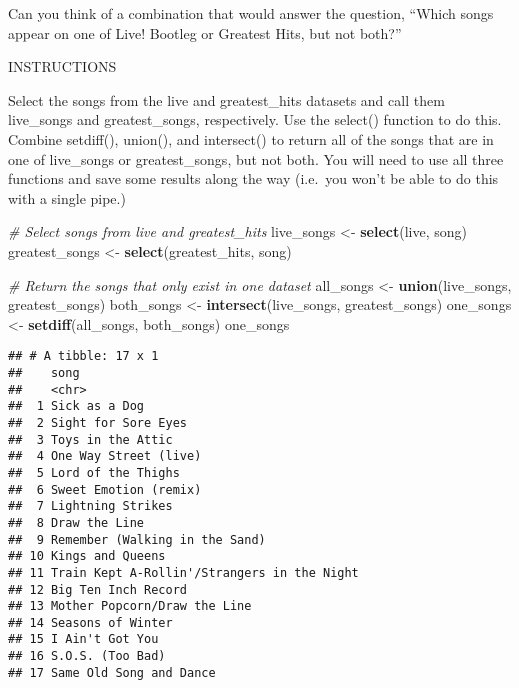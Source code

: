 \documentclass[]{article}
\newenvironment{Shaded}{\begin{snugshade}}{\end{snugshade}}
\newcommand{\KeywordTok}[1]{\textcolor[rgb]{0.13,0.29,0.53}{\textbf{#1}}}
\newcommand{\StringTok}[1]{\textcolor[rgb]{0.31,0.60,0.02}{#1}}
\newcommand{\CommentTok}[1]{\textcolor[rgb]{0.56,0.35,0.01}{\textit{#1}}}
\newcommand{\NormalTok}[1]{#1}
\begin{document}
Can you think of a combination that would answer the question, ``Which
songs appear on one of Live! Bootleg or Greatest Hits, but not both?''

INSTRUCTIONS

Select the songs from the live and greatest\_hits datasets and call them
live\_songs and greatest\_songs, respectively. Use the select() function
to do this. Combine setdiff(), union(), and intersect() to return all of
the songs that are in one of live\_songs or greatest\_songs, but not
both. You will need to use all three functions and save some results
along the way (i.e.~you won't be able to do this with a single pipe.)

\begin{Shaded}
\begin{Highlighting}[]
\CommentTok{# Select songs from live and greatest_hits}
\NormalTok{live_songs <-}\StringTok{ }\KeywordTok{select}\NormalTok{(live, song)}
\NormalTok{greatest_songs <-}\StringTok{ }\KeywordTok{select}\NormalTok{(greatest_hits, song)}

\CommentTok{# Return the songs that only exist in one dataset}
\NormalTok{all_songs <-}\StringTok{ }\KeywordTok{union}\NormalTok{(live_songs, greatest_songs)}
\NormalTok{both_songs <-}\StringTok{ }\KeywordTok{intersect}\NormalTok{(live_songs, greatest_songs)}
\NormalTok{one_songs <-}\StringTok{ }\KeywordTok{setdiff}\NormalTok{(all_songs, both_songs)}
\NormalTok{one_songs}
\end{Highlighting}
\end{Shaded}

\begin{verbatim}
## # A tibble: 17 x 1
##    song                                       
##    <chr>                                      
##  1 Sick as a Dog                              
##  2 Sight for Sore Eyes                        
##  3 Toys in the Attic                          
##  4 One Way Street (live)                      
##  5 Lord of the Thighs                         
##  6 Sweet Emotion (remix)                      
##  7 Lightning Strikes                          
##  8 Draw the Line                              
##  9 Remember (Walking in the Sand)             
## 10 Kings and Queens                           
## 11 Train Kept A-Rollin'/Strangers in the Night
## 12 Big Ten Inch Record                        
## 13 Mother Popcorn/Draw the Line               
## 14 Seasons of Winter                          
## 15 I Ain't Got You                            
## 16 S.O.S. (Too Bad)                           
## 17 Same Old Song and Dance
\end{verbatim}
\end{document}
